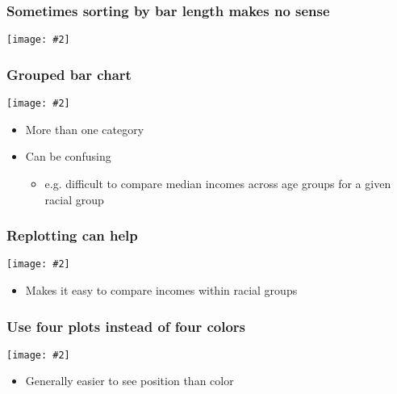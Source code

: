\documentclass{beamer}
\newcommand{\bi}{\begin{itemize}}
\newcommand{\li}{\item}
\newcommand{\ei}{\end{itemize}}
\newcommand{\fig}[2]{\centerline{\texttt{[image: \#2]}}}
\newcommand{\bfr}[1]{\begin{frame}[fragile]\frametitle{{ #1 }}}
\begin{document}
\bfr{Sometimes sorting by bar length makes no sense}

\fig{1}{income-by-age-sorted-1.png}
\end{frame}


\bfr{Grouped bar chart}
\fig{1}{income-by-age-race-dodged-1.png}
\bi
\li More than one category
\li Can be confusing
\bi\li e.g. difficult to  compare median incomes across age groups for a given racial group\ei
\ei
\end{frame}

\bfr{Replotting can help}
\fig{1}{income-by-race-age-dodged-1.png}

\bi
\li Makes it easy to compare incomes within racial groups
\ei
\end{frame}

\bfr{Use four plots instead of four colors}
\fig{1}{income-by-age-race-faceted-1.png}
\bi
\li Generally easier to see position than color
\ei
\end{frame}
\end{document}
